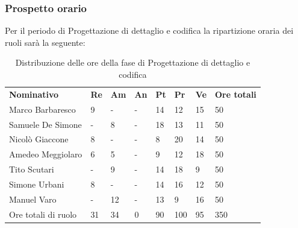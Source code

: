     \subsubsection{Prospetto orario}
    Per il periodo di Progettazione di dettaglio e codifica la ripartizione oraria dei ruoli sarà la seguente:
        \begin{center}
            \begin{table}[ht!]
                \centering
                \caption{Distribuzione delle ore della fase di Progettazione di dettaglio e codifica}
                \vspace{5px}
                \renewcommand{\arraystretch}{1.8}
                \begin{tabular}{p{100px} p{20px} p{20px} p{20px} p{20px} p{20px} p{20px} p{50px} }
                    \rowcolor{logo!70} \textbf{Nominativo} & \textbf{Re} & \textbf{Am} & \textbf{An} & \textbf{Pt} & \textbf{Pr} & \textbf{Ve} & \textbf{Ore totali}\\
                    Marco Barbaresco & 9 & - & - & 14 & 12 & 15 & 50\\
                    Samuele De Simone & - & 8 & - & 18 & 13 & 11 & 50\\
                    Nicolò Giaccone & 8 & - & - & 8 & 20 & 14 & 50\\
                    Amedeo Meggiolaro & 6 & 5 & - & 9 & 12 & 18 & 50\\
                    Tito Scutari & - & 9 & - & 14 & 18 & 9 & 50\\
                    Simone Urbani & 8 & - & - & 14 & 16 & 12 & 50\\
                    Manuel Varo & - & 12 & - & 13 & 9 & 16 & 50\\
                    Ore totali di ruolo & 31 & 34 & 0 & 90 & 100 & 95 & 350\\
                \end{tabular}
            \end{table}
        \end{center}
        \pagebreak
        
